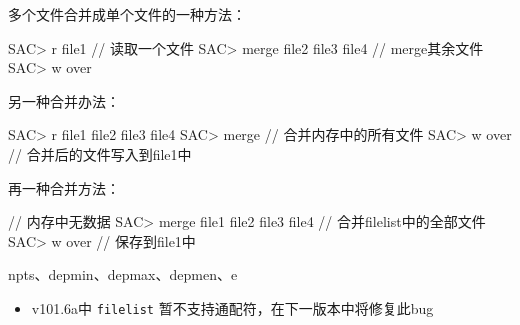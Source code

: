 多个文件合并成单个文件的一种方法：
\begin{SACCode}
SAC> r file1                        // 读取一个文件
SAC> merge file2 file3 file4        // merge其余文件
SAC> w over
\end{SACCode}

另一种合并办法：
\begin{SACCode}
SAC> r file1 file2 file3 file4
SAC> merge                      // 合并内存中的所有文件
SAC> w over                     // 合并后的文件写入到file1中
\end{SACCode}

再一种合并方法：
\begin{SACCode}                     // 内存中无数据
SAC> merge file1 file2 file3 file4  // 合并filelist中的全部文件
SAC> w over                         // 保存到file1中
\end{SACCode}

npts、depmin、depmax、depmen、e

\begin{itemize}
\item v101.6a中 \texttt{filelist} 暂不支持通配符，在下一版本中将修复此bug
\end{itemize}
